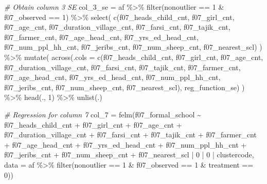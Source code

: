 \documentclass[
]{article}
\newenvironment{Shaded}{\begin{snugshade}}{\end{snugshade}}
\newcommand{\AttributeTok}[1]{\textcolor[rgb]{0.77,0.63,0.00}{#1}}
\newcommand{\CommentTok}[1]{\textcolor[rgb]{0.56,0.35,0.01}{\textit{#1}}}
\newcommand{\DecValTok}[1]{\textcolor[rgb]{0.00,0.00,0.81}{#1}}
\newcommand{\FunctionTok}[1]{\textcolor[rgb]{0.00,0.00,0.00}{#1}}
\newcommand{\NormalTok}[1]{#1}
\newcommand{\OtherTok}[1]{\textcolor[rgb]{0.56,0.35,0.01}{#1}}
\newcommand{\SpecialCharTok}[1]{\textcolor[rgb]{0.00,0.00,0.00}{#1}}
\begin{document}
\begin{Shaded}
\begin{Highlighting}[]
\CommentTok{\# Obtain column 3 SE}
\NormalTok{col\_3\_se }\OtherTok{=}\NormalTok{ af }\SpecialCharTok{\%\textgreater{}\%} 
  \FunctionTok{filter}\NormalTok{(nonoutlier }\SpecialCharTok{==} \DecValTok{1} \SpecialCharTok{\&}\NormalTok{ f07\_observed }\SpecialCharTok{==} \DecValTok{1}\NormalTok{) }\SpecialCharTok{\%\textgreater{}\%} 
  \FunctionTok{select}\NormalTok{(}
    \FunctionTok{c}\NormalTok{(f07\_heads\_child\_cnt, f07\_girl\_cnt, f07\_age\_cnt, f07\_duration\_village\_cnt,}
\NormalTok{                   f07\_farsi\_cnt,  f07\_tajik\_cnt,  f07\_farmer\_cnt, }
\NormalTok{                   f07\_age\_head\_cnt, f07\_yrs\_ed\_head\_cnt, f07\_num\_ppl\_hh\_cnt, f07\_jeribs\_cnt,  }
\NormalTok{                   f07\_num\_sheep\_cnt, f07\_nearest\_scl)}
\NormalTok{  ) }\SpecialCharTok{\%\textgreater{}\%} 
  \FunctionTok{mutate}\NormalTok{(}
  \FunctionTok{across}\NormalTok{(}\AttributeTok{.cols =} \FunctionTok{c}\NormalTok{(f07\_heads\_child\_cnt, f07\_girl\_cnt, f07\_age\_cnt, f07\_duration\_village\_cnt,}
\NormalTok{                   f07\_farsi\_cnt,  f07\_tajik\_cnt,  f07\_farmer\_cnt, }
\NormalTok{                   f07\_age\_head\_cnt, f07\_yrs\_ed\_head\_cnt, f07\_num\_ppl\_hh\_cnt, f07\_jeribs\_cnt, }
\NormalTok{                   f07\_num\_sheep\_cnt, f07\_nearest\_scl), reg\_function\_se)}
\NormalTok{  ) }\SpecialCharTok{\%\textgreater{}\%} \FunctionTok{head}\NormalTok{(., }\DecValTok{1}\NormalTok{) }\SpecialCharTok{\%\textgreater{}\%} \FunctionTok{unlist}\NormalTok{(.)}

\CommentTok{\# Regression for column 7}
\NormalTok{col\_7 }\OtherTok{=} \FunctionTok{felm}\NormalTok{(f07\_formal\_school }\SpecialCharTok{\textasciitilde{}}\NormalTok{ f07\_heads\_child\_cnt }\SpecialCharTok{+} 
\NormalTok{               f07\_girl\_cnt }\SpecialCharTok{+}\NormalTok{ f07\_age\_cnt }\SpecialCharTok{+}\NormalTok{ f07\_duration\_village\_cnt }\SpecialCharTok{+} 
\NormalTok{               f07\_farsi\_cnt }\SpecialCharTok{+}\NormalTok{ f07\_tajik\_cnt }\SpecialCharTok{+}\NormalTok{ f07\_farmer\_cnt }\SpecialCharTok{+} 
\NormalTok{               f07\_age\_head\_cnt }\SpecialCharTok{+}\NormalTok{ f07\_yrs\_ed\_head\_cnt }\SpecialCharTok{+}\NormalTok{ f07\_num\_ppl\_hh\_cnt }\SpecialCharTok{+} 
\NormalTok{               f07\_jeribs\_cnt }\SpecialCharTok{+}\NormalTok{ f07\_num\_sheep\_cnt }\SpecialCharTok{+}\NormalTok{ f07\_nearest\_scl}
             \SpecialCharTok{|} \DecValTok{0} \SpecialCharTok{|} \DecValTok{0} \SpecialCharTok{|}\NormalTok{ clustercode, }
             \AttributeTok{data =}\NormalTok{ af }\SpecialCharTok{\%\textgreater{}\%} 
               \FunctionTok{filter}\NormalTok{(nonoutlier }\SpecialCharTok{==} \DecValTok{1} \SpecialCharTok{\&}\NormalTok{ f07\_observed }\SpecialCharTok{==} \DecValTok{1} \SpecialCharTok{\&}\NormalTok{ treatment }\SpecialCharTok{==} \DecValTok{0}\NormalTok{))}


\end{Highlighting}
\end{Shaded}
\end{document}
